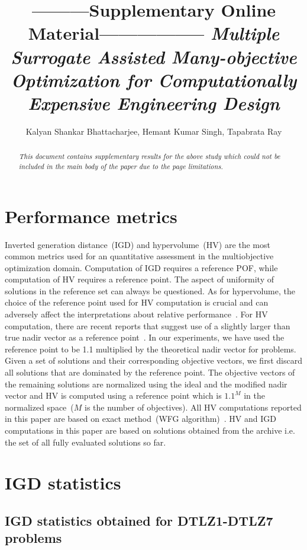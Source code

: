 \documentclass[onecolumn,10pt]{asme2ej}
\title{---------Supplementary Online Material----------------- \emph{Multiple Surrogate Assisted Many-objective Optimization for {\color{blue}Computationally Expensive} Engineering Design}}
\author{Kalyan Shankar Bhattacharjee, Hemant Kumar Singh, Tapabrata Ray}
\begin{document}
\maketitle    

\begin{abstract}
	{\it This document contains supplementary results for the above study which could not be included in the main body of the paper due to the page limitations.}
\end{abstract}

\section{Performance metrics}
Inverted generation distance~(IGD) and hypervolume~(HV) are the most common metrics used for an quantitative assessment in the multiobjective optimization domain. Computation of IGD requires a reference POF, while computation of HV requires a reference point. The aspect of uniformity of solutions in the reference set can always be questioned. As for hypervolume, the choice of the reference point used for HV computation is crucial and can adversely affect the interpretations about relative performance~\cite{KHTYuan2016many,KHTishibuchi2010many}. For HV computation, there are recent reports that suggest use of a slightly larger than true nadir vector as a reference point~\cite{KHTYuan2016many,KHTishibuchi2010many}. In our experiments, we have used the reference point to be 1.1 multiplied by the theoretical nadir vector for problems. Given a set of solutions and their corresponding objective vectors, we first discard all solutions that are dominated by the reference point. The objective vectors of the remaining solutions are normalized using the ideal and the modified nadir vector and HV is computed using a reference point which is $1.1^M$ in the normalized space~($M$ is the number of objectives). All HV computations reported in this paper are based on exact method~(WFG algorithm)~\cite{KHTwhile2012hv}. HV and IGD computations in this paper are based on solutions obtained from the archive i.e. the set of all fully evaluated solutions so far.

\clearpage

\section{IGD statistics}
\subsection{IGD statistics obtained for DTLZ1-DTLZ7 problems}
\end{document}
